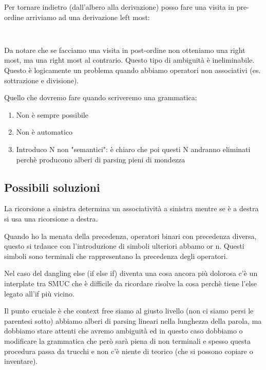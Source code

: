 Per tornare indietro (dall'albero alla derivazione) posso fare una visita in pre-ordine arriviamo ad una derivazione left most:
\begin{lstlisting}
    
\end{lstlisting}

Da notare che se facciamo una visita in post-ordine non otteniamo una right most, ma una right most al contrario. Questo tipo di ambiguità è ineliminabile.
Questo è logicamente un problema quando abbiamo operatori non associativi (es. sottrazione e divisione).

Quello che dovremo fare quando scriveremo una grammatica:
\begin{enumerate}
    \item Non è sempre possibile
    \item Non è automatico
    \item Introduco N non "semantici": è chiaro che poi questi N andranno eliminati perchè producono alberi di parsing pieni di mondezza
\end{enumerate}

\subsection{Possibili soluzioni}
La ricorsione a sinistra determina un associatività a sinistra mentre se è a destra si usa una ricorsione a destra.

Quando ho la menata della precedenza, operatori binari con precedenza diversa, questo si trdauce con l'introduzione di simboli ulteriori abbamo or n. Questi simboli sono terminali che rappresentano la precedenza degli operatori.

Nel caso del dangling else (if else if) diventa una cosa ancora più dolorosa c'è un interplate tra SMUC che è difficile da ricordare risolve la cosa perchè tiene l'else legato all'if più vicino.

Il punto cruciale è che context free siamo al giusto livello (non ci siamo persi le parentesi sotto) abbiamo alberi di parsing lineari nella lunghezza della parola, ma dobbiamo stare attenti che avremo ambiguità ed in questo caso dobbiamo o modificare la grammatica che però sarà piena di non terminali e spesso questa procedura passa da trucchi e non c'è niente di teorico (che si possono copiare o inventare).